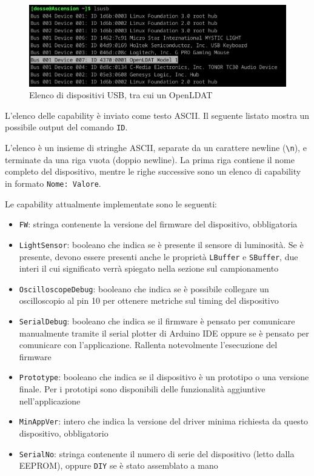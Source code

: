 \begin{figure}[h]
	\centering
	\includegraphics[width=\textwidth]{Dispositivo_files/lsusb.png}
	\caption{Elenco di dispositivi USB, tra cui un OpenLDAT}
	\label{fig:lsusb}
\end{figure}

L'elenco delle capability è inviato come testo ASCII. Il seguente listato mostra un possibile output del comando \texttt{ID}.

L'elenco è un insieme di stringhe ASCII, separate da un carattere newline (\texttt{\textbackslash n}), e terminate da una riga vuota (doppio newline). La prima riga contiene il nome completo del dispositivo, mentre le righe successive sono un elenco di capability in formato \texttt{Nome: Valore}.

Le capability attualmente implementate sono le seguenti:
\begin{itemize}
	\item \texttt{FW}: stringa contenente la versione del firmware del dispositivo, obbligatoria
	\item \texttt{LightSensor}: booleano che indica se è presente il sensore di luminosità. Se è presente, devono essere presenti anche le proprietà \texttt{LBuffer} e \texttt{SBuffer}, due interi il cui significato verrà spiegato nella sezione sul campionamento
	\item \texttt{OscilloscopeDebug}: booleano che indica se è possibile collegare un oscilloscopio al pin 10 per ottenere metriche sul timing del dispositivo
	\item \texttt{SerialDebug}: booleano che indica se il firmware è pensato per comunicare manualmente tramite il serial plotter di Arduino IDE oppure se è pensato per comunicare con l'applicazione. Rallenta notevolmente l'esecuzione del firmware
	\item \texttt{Prototype}: booleano che indica se il dispositivo è un prototipo o una versione finale. Per i prototipi sono disponibili delle funzionalità aggiuntive nell'applicazione
	\item \texttt{MinAppVer}: intero che indica la versione del driver minima richiesta da questo dispositivo, obbligatorio
	\item \texttt{SerialNo}: stringa contenente il numero di serie del dispositivo (letto dalla EEPROM), oppure \texttt{DIY} se è stato assemblato a mano
\end{itemize}

